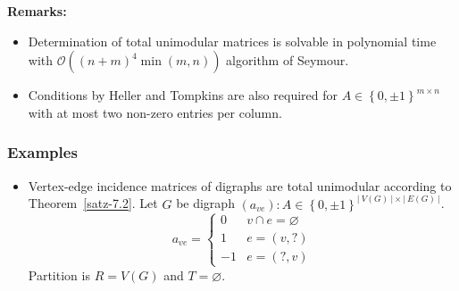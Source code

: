 \documentclass{article}
\newcommand{\card}[1]{\left|\:\!#1\:\!\right|}
\newcommand{\set}[1]{\left\{#1\right\}}
\begin{document}
\textbf{Remarks:}
\begin{itemize}
  \item Determination of total unimodular matrices is solvable in polynomial time with $\mathcal{O}((n + m)^4 \min{(m, n)})$ algorithm of Seymour.
  \item Conditions by Heller and Tompkins are also required for $A \in \set{0, \pm 1}^{m \times n}$ with at most two non-zero entries per column.
\end{itemize}

\subsubsection{Examples}
\begin{itemize}
  \item
    Vertex-edge incidence matrices of digraphs are total unimodular according to Theorem~\ref{satz-7.2}.
    Let $G$ be digraph $(a_{ve}): A \in \set{0, \pm 1}^{\card{V(G)} \times \card{E(G)}}$.
    \[
      a_{ve} = \begin{cases}
        0   & v \cap e = \diameter \\
        1   & e = (v, ?) \\
        -1  & e = (?, v)
      \end{cases}
    \]
    Partition is $R = V(G)$ and $T = \diameter$.


\end{itemize}
\end{document}
